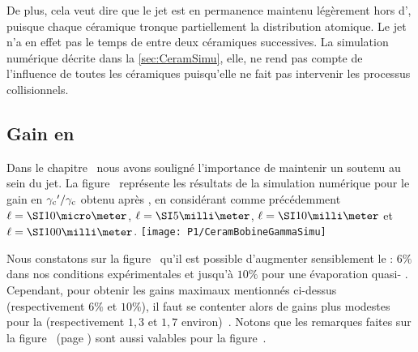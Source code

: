 De plus, cela veut dire que le jet est en permanence maintenu légèrement hors d'\eqthdy, puisque chaque céramique tronque partiellement la distribution atomique. Le jet n'a en effet pas le temps de \rether entre deux céramiques successives. La simulation numérique décrite dans la \autoref{sec:CeramSimu}, elle, ne rend pas compte de l'influence de toutes les céramiques puisqu'elle ne fait pas intervenir les processus collisionnels.


\subsection{Gain en \tcolel}\label{sec:CeramSimuGainTcol}
Dans le chapitre~ nous avons souligné l'importance de maintenir un \tcolel soutenu au sein du jet. La figure~ représente les résultats de la simulation numérique pour le gain en \tcolel 
$
{{{{\gamma_{\rm c}}'}} / {{\gamma_{\rm c}}}}
$
obtenu après \reth, en considérant comme précédemment $\CeramLong=\micron{10}$, $\CeramLong=\mm{5}$, $\CeramLong=\mm{10}$ et $\CeramLong=\mm{100}$.
%
\bfighs
\texttt{[image: P1/CeramBobineGammaSimu]}
\label{fig:CeramBobineGammaSimu}
\efigh

\casse

Nous constatons sur la figure~ qu'il est possible d'augmenter sensiblement le \tcolel : $6\%$ dans nos conditions expérimentales et jusqu'à $10\%$ pour une évaporation quasi-\bde%
{%
. Cependant, pour obtenir les gains maximaux mentionnés ci-dessus (respectivement $6\%$ et $10\%$), il faut se contenter alors de gains plus modestes pour la \ddedpup (respectivement $1,3$ et $1,7$ environ)~\cite{LaG06}.
}%
\noindent Notons que les remarques faites sur la figure~ (page \pageref{sec:CeramBobineDDEDPUPSimuInterpretation}) sont aussi valables pour la figure~.





